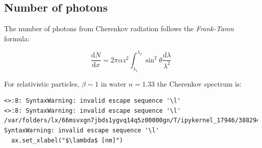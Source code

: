 \documentclass[
  letterpaper,
  DIV=11,
  numbers=noendperiod]{scrreprt}
\newenvironment{Shaded}{\begin{snugshade}}{\end{snugshade}}
\newcommand{\CommentTok}[1]{\textcolor[rgb]{0.37,0.37,0.37}{#1}}
\newcommand{\DecValTok}[1]{\textcolor[rgb]{0.68,0.00,0.00}{#1}}
\newcommand{\FloatTok}[1]{\textcolor[rgb]{0.68,0.00,0.00}{#1}}
\newcommand{\ImportTok}[1]{\textcolor[rgb]{0.00,0.46,0.62}{#1}}
\newcommand{\NormalTok}[1]{\textcolor[rgb]{0.00,0.23,0.31}{#1}}
\newcommand{\OperatorTok}[1]{\textcolor[rgb]{0.37,0.37,0.37}{#1}}
\newcommand{\SpecialCharTok}[1]{\textcolor[rgb]{0.37,0.37,0.37}{#1}}
\newcommand{\StringTok}[1]{\textcolor[rgb]{0.13,0.47,0.30}{#1}}
\newcommand{\VerbatimStringTok}[1]{\textcolor[rgb]{0.13,0.47,0.30}{#1}}
\begin{document}
\subsection{Number of photons}\label{number-of-photons}

The number of photons from Cherenkov radiation follows the
\emph{Frank-Tamn} formula:

\[\frac{\mathrm{d}N}{\mathrm{d}x} = 2 \pi \alpha z^2\int_{\lambda_1}^{\lambda_2} \sin^2\theta \frac{\mathrm{d}\lambda}{\lambda^2}\]

For relativistic particles, \(\beta \sim 1\) in water \(n = 1.33\) the
Cherenkov spectrum is:

\begin{Shaded}
\end{Shaded}

\begin{verbatim}
<>:8: SyntaxWarning: invalid escape sequence '\l'
<>:8: SyntaxWarning: invalid escape sequence '\l'
/var/folders/lx/66msvxgn7jbds1ygvq14q5z00000gn/T/ipykernel_17946/3882946818.py:8: SyntaxWarning: invalid escape sequence '\l'
  ax.set_xlabel("$\lambda$ [nm]")
\end{verbatim}
\end{document}
